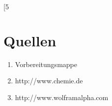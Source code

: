 [5~\documentclass[a4paper,ngerman]{scrartcl}
\begin{document}
\clearpage
\section{Quellen}
\begin{enumerate}
\item Vorbereitungsmappe \label{ref:mappe}
\item http://www.chemie.de \label{ref:chemie.de}
\item http://www.wolframalpha.com \label{ref:wolfram}
\end{enumerate}
\end{document}
